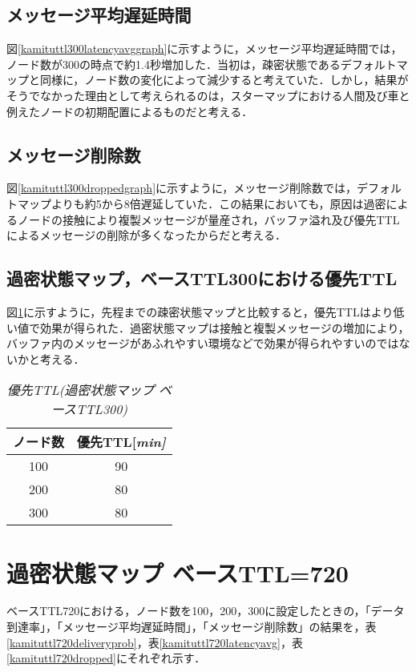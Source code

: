 \documentclass[11pt]{icsthesis}
\begin{document}
\subsection{メッセージ平均遅延時間}
図\ref{kamituttl300latencyavggraph}に示すように，メッセージ平均遅延時間では，ノード数が300の時点で約1.4秒増加した．当初は，疎密状態であるデフォルトマップと同様に，ノード数の変化によって減少すると考えていた．しかし，結果がそうでなかった理由として考えられるのは，スターマップにおける人間及び車と例えたノードの初期配置によるものだと考える．

\subsection{メッセージ削除数}
図\ref{kamituttl300droppedgraph}に示すように，メッセージ削除数では，デフォルトマップよりも約5から8倍遅延していた．この結果においても，原因は過密によるノードの接触により複製メッセージが量産され，バッファ溢れ及び優先TTLによるメッセージの削除が多くなったからだと考える．

\subsection{過密状態マップ，ベースTTL300における優先TTL}
図\ref{priorityTTL_kamitsu300}に示すように，先程までの疎密状態マップと比較すると，優先TTLはより低い値で効果が得られた．過密状態マップは接触と複製メッセージの増加により，バッファ内のメッセージがあふれやすい環境などで効果が得られやすいのではないかと考える．
\begin{table}[H]
	\begin{center}
			 \caption[]{\it{優先TTL(過密状態マップ ベースTTL300)}}
			 \label{priorityTTL_kamitsu300}
			 \begin{tabular}{|c|c|}
 \hline
 ノード数&優先TTL[\it{min}]\\
 \hline
 100&90\\
 \hline
 200&80\\
 \hline
 300&80\\
 \hline
			 \end{tabular}
		 \end{center}
 \end{table}
\newpage

\section{過密状態マップ ベースTTL=720}
ベースTTL720における，ノード数を100，200，300に設定したときの，「データ到達率」，「メッセージ平均遅延時間」，「メッセージ削除数」の結果を，表\ref{kamituttl720deliveryprob}，表\ref{kamituttl720latencyavg}，表\ref{kamituttl720dropped}にそれぞれ示す．
\end{document}
